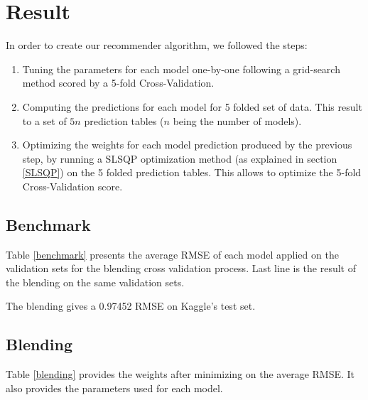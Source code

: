 \documentclass[10pt,conference,compsocconf]{IEEEtran}
\begin{document}
\section{Result}

In order to create our recommender algorithm, we followed the steps: 
\begin{enumerate}
\item Tuning the parameters for each model one-by-one following a grid-search method scored by a 5-fold Cross-Validation. 

\item Computing the predictions for each model for 5 folded set of data. This result to a set of $5n$ prediction tables ($n$ being the number of models).

\item Optimizing the weights for each model prediction produced by the previous step, by running a SLSQP optimization method (as explained in section \ref{SLSQP}) on the 5 folded prediction tables. This allows to optimize the 5-fold Cross-Validation score.
\end{enumerate}


\subsection{Benchmark}
\label{sec:model_bench}

Table \ref{benchmark} presents the average RMSE of each model applied on the validation sets for the blending cross validation process. Last line is the result of the blending on the same validation sets.


The blending gives a 0.97452 RMSE on Kaggle's test set. 


\subsection{Blending}

Table \ref{blending} provides the weights after minimizing on the average RMSE. It also provides the parameters used for each model.
\end{document}
